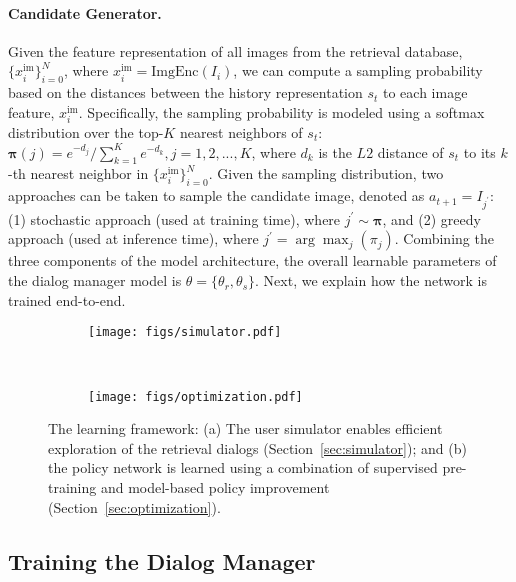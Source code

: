 \paragraph{Candidate Generator.} 
Given the feature representation of all images from the retrieval database, 
$\{x_i^{\textrm{im}}\}_{i=0}^{N}$, where $x_i^{\textrm{im}} = \textrm{ImgEnc}(I_i)$, 
we can compute a sampling probability based on the distances between
the history representation $s_{t}$ to each image feature, $x_i^{\textrm{im}}$.
Specifically, the sampling probability is modeled 
using a softmax distribution over the top-$K$ nearest neighbors
of $s_t$: $\mathbf{\pi}(j) = e^{-{d_j}} / \sum_{k=1}^{K}e^{-{d_k}}, j=1,2,...,K$, where $d_k$ is the $L2$ distance of $s_t$ to its $k$-th nearest neighbor in 
$\{x_i^{\textrm{im}}\}_{i=0}^{N}$. Given the sampling distribution, 
two approaches can be taken to sample the candidate image, denoted as $a_{t+1} = I_{j^{\prime}}$: 
(1) stochastic approach (used at training time), where $j^{\prime} \sim \mathbf{\pi}$, and (2) greedy
approach (used at inference time), where $j^{\prime} = \arg\max_{j}(\pi_{j})$. 
Combining the three components of the model architecture, the overall learnable
parameters of the dialog manager model is $\theta=\{\theta_{r}, \theta_{s}\}$. 
Next, we explain how the network is trained end-to-end. 


\begin{figure*}[ht!]
\centering
    \begin{subfigure}[t]{0.45\textwidth}
        \centering
        \texttt{[image: figs/simulator.pdf]}
        \caption{}
    \end{subfigure}%
    ~ 
    \begin{subfigure}[t]{0.55\textwidth}
        \centering
        \texttt{[image: figs/optimization.pdf]}
        \caption{}
    \end{subfigure}
    \caption{The learning framework: (a) The user simulator enables efficient 
    exploration of the retrieval dialogs (Section~\ref{sec:simulator}); 
    and (b) the policy network is learned using a combination of supervised 
    pre-training and model-based policy improvement (Section~\ref{sec:optimization}).}
    \label{fig:pipeline}
\end{figure*}

\subsection{Training the Dialog Manager}
\label{sec:drl}

